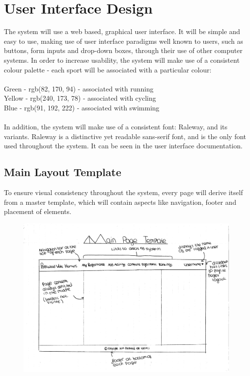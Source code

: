 \documentclass{article}[12pt,a4paper]
\begin{document}
\section{User Interface Design}
The system will use a web based, graphical user interface. It will be simple and easy to use, making use of user interface paradigms well known to users, such as buttons, form inputs and drop-down boxes, through their use of other computer systems. In order to increase usability, the system will make use of a consistent colour palette - each sport will be associated with a particular colour:
\\\\\textcolor{uigreen}{Green - rgb(82, 170, 94) - associated with running}
\\\textcolor{uiyellow}{Yellow - rgb(240, 173, 78) - associated with cycling}
\\\textcolor{uiblue}{Blue - rgb(91, 192, 222) - associated with swimming}
\\\\In addition, the system will make use of a consistent font: Raleway, and its variants. Raleway is a distinctive yet readable sans-serif font, and is the only font used throughout the system. It can be seen in the user interface documentation.

\subsection{Main Layout Template}
To ensure visual consistency throughout the system, every page will derive itself from a master template, which will contain aspects like navigation, footer and placement of elements.

\begin{figure}[h!]
  \includegraphics[scale=0.45]{design_ui/layout}
\end{figure}
\clearpage
\end{document}
